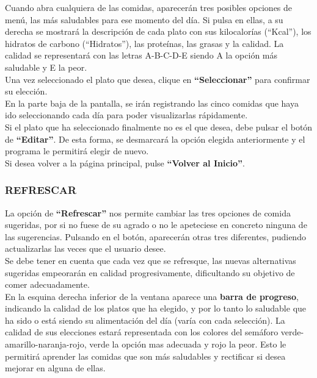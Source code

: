 Cuando abra cualquiera de las comidas, aparecerán tres posibles opciones de menú, las más saludables para ese momento del día. Si pulsa en ellas, a su derecha se mostrará la descripción de cada plato con sus kilocalorías (“Kcal”), los hidratos de carbono (“Hidratos”), las proteínas, las grasas y la calidad. La calidad se representará con las letras A-B-C-D-E siendo A la opción más saludable y E la peor.
\\
Una vez seleccionado el plato que desea, clique en \textbf{“Seleccionar”} para confirmar su elección.\\
En la parte baja de la pantalla, se irán registrando las cinco comidas que haya ido seleccionando cada día para poder visualizarlas rápidamente.\\
Si el plato que ha seleccionado finalmente no es el que desea, debe pulsar el botón de \textbf{“Editar”}. De esta forma, se desmarcará la opción elegida anteriormente y el programa le permitirá elegir de nuevo.\\
Si desea volver a la página principal, pulse \textbf{“Volver al Inicio”}.
\subsubsection{REFRESCAR}
La opción de \textbf{“Refrescar”} nos permite cambiar las tres opciones de comida sugeridas, por si no fuese de su agrado o no le apeteciese en concreto ninguna de las sugerencias. Pulsando en el botón, aparecerán otras tres diferentes, pudiendo actualizarlas las veces que el usuario desee.\\

Se debe tener en cuenta que cada vez que se refresque, las nuevas alternativas sugeridas empeorarán en calidad progresivamente, dificultando su objetivo de comer adecuadamente.\\

En la esquina derecha inferior de la ventana aparece una \textbf{barra de progreso}, indicando la calidad de los platos que ha elegido, y por lo tanto lo saludable que ha sido o está siendo su alimentación del día (varía con cada selección). La calidad de sus elecciones estará representada con los colores del semáforo verde-amarillo-naranja-rojo, verde la opción mas adecuada y rojo la peor. Esto le permitirá aprender las comidas que son más saludables y rectificar si desea mejorar en alguna de ellas.\\

